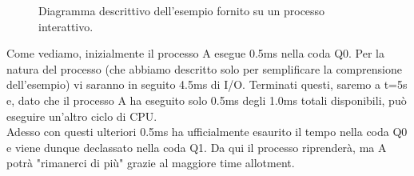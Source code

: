\documentclass[12pt]{report}
\begin{document}
	\begin{figure}[H]
		\centering
		\caption{Diagramma descrittivo dell'esempio fornito su un processo interattivo.}
	\end{figure}
	Come vediamo, inizialmente il processo A esegue 0.5ms nella coda Q0. Per la natura del processo (che abbiamo descritto solo per semplificare la comprensione dell'esempio) vi saranno in seguito 4.5ms di I/O. Terminati questi, saremo a t=5s e, dato che il processo A ha eseguito solo 0.5ms degli 1.0ms totali disponibili, può eseguire un'altro ciclo di CPU.\\
	Adesso con questi ulteriori 0.5ms ha ufficialmente esaurito il tempo nella coda Q0 e viene dunque declassato nella coda Q1. Da qui il processo riprenderà, ma A potrà "rimanerci di più" grazie al maggiore time allotment.
	
\end{document}

